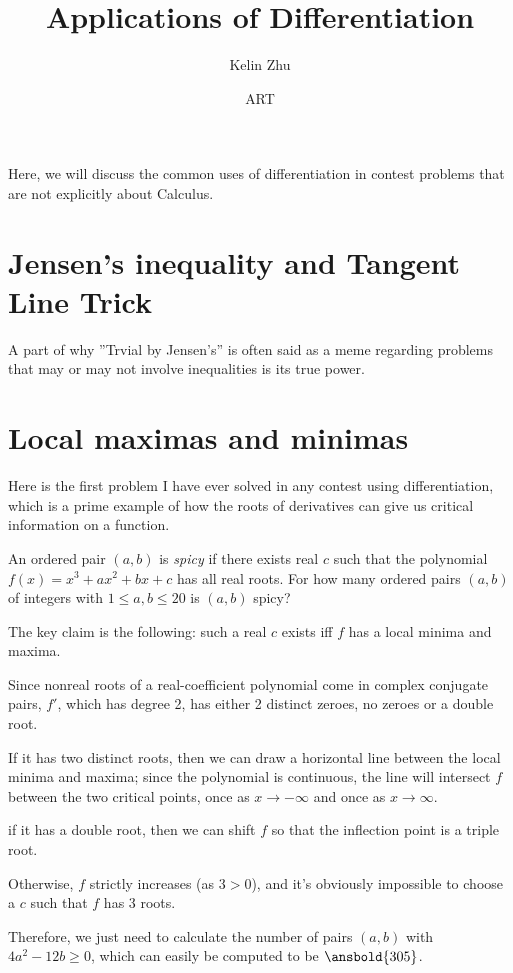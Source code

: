 \documentclass[mast]{lucky}
\title{Applications of Differentiation}
\author{Kelin Zhu}
\date{ART}
\begin{document}
\maketitle
Here, we will discuss the common uses of differentiation in contest problems that are not explicitly about Calculus.
\section{Jensen's inequality and Tangent Line Trick}
A part of why ''Trvial by Jensen's'' is often said as a meme regarding problems that may or may not involve inequalities is its true power.

\section{Local maximas and minimas}
Here is the first problem I have ever solved in any contest using differentiation, which is a prime example of how the roots of derivatives can give us critical information on a function.
\begin{exam}
An ordered pair $(a,b)$ is \textit{spicy} if there exists real $c$ such that the polynomial $f(x)=x^3+ax^2+bx+c$ has all real roots. For how many ordered pairs $(a,b)$ of integers with $1\le a,b\le 20$ is $(a,b)$ spicy?
\end{exam}
\begin{sol}
The key claim is the following: such a real $c$ exists iff $f$ has a local minima and maxima.

Since nonreal roots of a real-coefficient polynomial come in complex conjugate pairs, $f'$, which has degree 2, has either 2 distinct zeroes, no zeroes or a double root.

If it has two distinct roots, then we can draw a horizontal line between the local minima and maxima; since the polynomial is continuous, the line will intersect $f$ between the two critical points, once as $x\rightarrow -\infty$ and once as $x\rightarrow \infty$.

if it has a double root, then we can shift $f$ so that the inflection point is a triple root.

Otherwise, $f$ strictly increases (as $3>0$), and it's obviously impossible to choose a $c$ such that $f$ has 3 roots.

Therefore, we just need to calculate the number of pairs $(a,b)$ with $4a^2-12b\ge 0$, which can easily be computed to be $\ansbold{305}$.
\end{sol}
\end{document}
